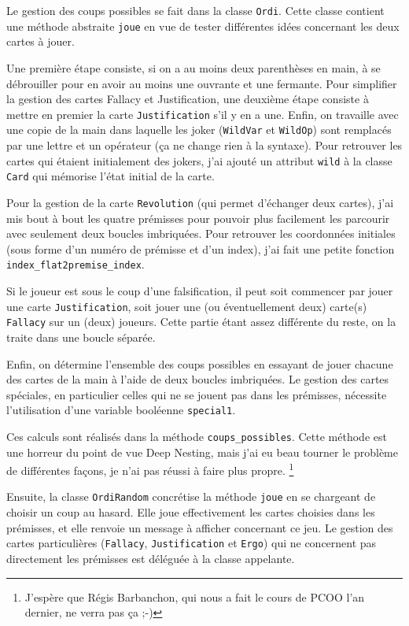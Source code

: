 \documentclass[12pt, algo]{cours}
\begin{document}
Le gestion des coups possibles se fait dans la classe \texttt{Ordi}. Cette classe contient une méthode abstraite \texttt{joue} en vue de tester différentes idées concernant les deux cartes à jouer.

Une première étape consiste, si on a au moins deux parenthèses en main, à se débrouiller pour en avoir au moins une ouvrante et une fermante. Pour simplifier la gestion des cartes Fallacy et Justification, une deuxième étape consiste à mettre en premier la carte \texttt{Justification} s'il y en a une. Enfin, on travaille avec une copie de la main dans laquelle les joker (\texttt{WildVar} et \texttt{WildOp}) sont remplacés par une lettre et un opérateur (ça ne change rien à la syntaxe). Pour retrouver les cartes qui étaient initialement des jokers, j'ai ajouté un attribut \texttt{wild} à la classe \texttt{Card} qui mémorise l'état initial de la carte.

\smallskip
Pour la gestion de la carte \texttt{Revolution} (qui permet d'échanger deux cartes), j'ai mis bout à bout les quatre prémisses pour pouvoir plus facilement les parcourir avec seulement deux boucles imbriquées. Pour retrouver les coordonnées initiales (sous forme d'un numéro de prémisse et d'un index), j'ai fait une petite fonction \texttt{index\_flat2premise\_index}.

\smallskip
Si le joueur est sous le coup d'une falsification, il peut soit commencer par jouer une carte \texttt{Justification}, soit jouer une (ou éventuellement deux) carte(s) \texttt{Fallacy} sur un (deux) joueurs. Cette partie étant assez différente du reste, on la traite dans une boucle séparée.

Enfin, on détermine l'ensemble des coups possibles en essayant de jouer chacune des cartes de la main à l'aide de deux boucles imbriquées. Le gestion des cartes spéciales, en particulier celles qui ne se jouent pas dans les prémisses, nécessite l'utilisation d'une variable booléenne \texttt{special1}.

Ces calculs sont réalisés dans la méthode \texttt{coups\_possibles}. Cette méthode est une horreur du point de vue Deep Nesting, mais j'ai eu beau tourner le problème de différentes façons, je n'ai pas réussi à faire plus propre. \footnote{J'espère que Régis Barbanchon, qui nous a fait le cours de PCOO l'an dernier, ne verra pas ça ;-)}

\smallskip
Ensuite, la classe \texttt{OrdiRandom} concrétise la méthode \texttt{joue} en se chargeant de choisir un coup au hasard. Elle joue effectivement les cartes choisies dans les prémisses, et elle renvoie un message à afficher concernant ce jeu. Le gestion des cartes particulières (\texttt{Fallacy}, \texttt{Justification} et \texttt{Ergo}) qui ne concernent pas directement les prémisses est déléguée à la classe appelante.
\end{document}
